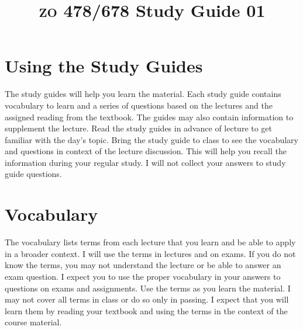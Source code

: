 \documentclass[letterpaper]{tufte-handout}
\title{{\scshape zo} 478/678 Study Guide 01}
\date{} %
\begin{document}
\maketitle	%


\section{Using the Study Guides}
The study guides will help you learn the material.  Each study guide contains vocabulary to learn and a series of questions based on the lectures and the assigned reading from the textbook.  The guides may also contain information to supplement the lecture.  Read the study guides in advance of lecture to get familiar with the day's topic. Bring the study guide to class to see the vocabulary and questions in context of the lecture discussion.  This will help you recall the information during your regular study. I will not collect your answers to study guide questions.

\section{Vocabulary}
The vocabulary lists terms from each lecture that you learn and be able to apply in a broader context.  I will use the terms in lectures and on exams. If you do not know the terms, you may not understand the lecture or be able to answer an exam question. I expect you to use the proper vocabulary in your answers to questions on exams and assignments.  Use the terms as you learn the material.  I may not cover all terms in class or do so only in passing.  I expect that you will learn them by reading your textbook and using the terms in the context of the course material.
\end{document}
